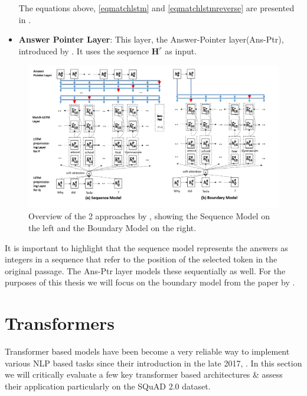 \documentclass[a4paper,12pt]{report}
\begin{document}
\begin{itemize}
		The equations above, \ref{eqmatchlstm} and \ref{eqmatchlstmreverse} are presented in \citep{lstmhu2016question}. 
             	\item \textbf{Answer Pointer Layer}: This layer, the Answer-Pointer layer(Ans-Ptr), introduced by \citep{lstmPointer}. It uses the sequence $ \textbf{H}^{r} $ as input. 
             \end{itemize}
         	  \begin{figure}
	         	\centering
	         	\includegraphics[scale=0.4]{../images/lstmMatch.png}
	         	\caption{Overview of the 2 approaches by \citep{lstmhu2016question}, showing the Sequence Model on the left and the Boundary Model on the right.}\label{lstmMatch}
	         \end{figure}

		It is important to highlight that the sequence model represents the answers as integers in a sequence that refer to the position of the selected token in the original passage. The Ans-Ptr layer models these sequentially as well. For the purposes of this thesis we will focus on the boundary model from the paper by \citep{lstmhu2016question}.



	    \section{Transformers}\label{23}

	        Transformer based models have been become a very reliable way to implement various NLP based tasks since their introduction in the late 2017, \citep{atayl}. In this section we will critically evaluate a few key transformer based architectures \& assess their application particularly on the SQuAD 2.0 dataset.
\end{document}
